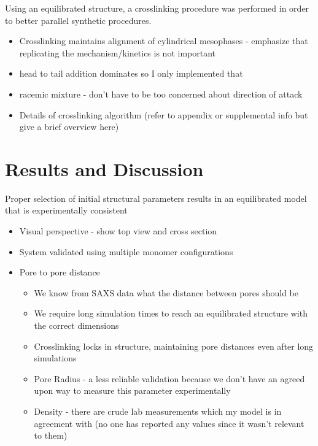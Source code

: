 \documentclass{article}
\begin{document}
	Using an equilibrated structure, a crosslinking procedure was performed in order to better parallel synthetic procedures. 
	\begin{itemize}
		\item Crosslinking maintains alignment of cylindrical mesophases - emphasize that replicating the mechanism/kinetics is not important 
		\item head to tail addition dominates so I only implemented that
		\item racemic mixture - don't have to be too concerned about direction of attack 
		\item Details of crosslinking algorithm (refer to appendix or supplemental info but give a brief overview here)
	\end{itemize}  
	
	\section{Results and Discussion}

	Proper selection of initial structural parameters results in an equilibrated model that is experimentally consistent 
	\begin{itemize}
		\item Visual perspective - show top view and cross section
		\item System validated using multiple monomer configurations 
		\item Pore to pore distance
		\begin{itemize}
			\item We know from SAXS data what the distance between pores should be
			\item We require long simulation times to reach an equilibrated structure with the correct dimensions
			\item Crosslinking locks in structure, maintaining pore distances even after long simulations
		\item Pore Radius - a less reliable validation because we don't have an agreed upon way to measure this parameter experimentally
		\item Density - there are crude lab measurements which my model is in agreement with (no one has reported any values since it wasn't relevant to them)
		\end{itemize}
	\end{itemize}
	
\end{document}
